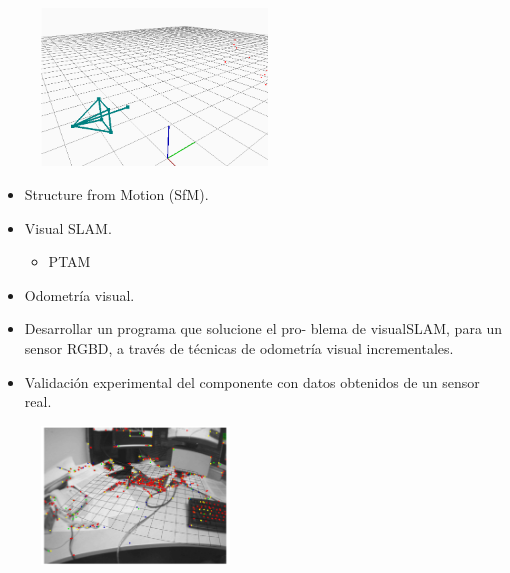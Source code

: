 \documentclass[notes,slidesec,a4]{seminar}
\begin{document}
\begin{hslide}
	\begin{minipage}{6cm}
		\begin{center}
			\begin{figure}
				\includegraphics[width=6.0cm]{img/camera-opengl.png}
			\end{figure}
		\end{center}
	\end{minipage} \hfill
	\begin{minipage}{5cm}
		\begin{itemize}
			\item Structure from Motion (SfM).
			\item Visual SLAM.
			\begin{itemize}
				\item PTAM
			\end{itemize}
			\item Odometría visual.
		\end{itemize}
	\end{minipage}
\end{hslide}


\begin{hslide}
			\begin{itemize}
			\item Desarrollar un programa que solucione el pro-
			blema de visualSLAM, para un sensor RGBD, a través de técnicas de odometría visual incrementales.
			\item Validación experimental del componente con datos obtenidos de un sensor real.
		\end{itemize}
		\begin{center}
			\begin{figure}
				\includegraphics[width=5cm] {img/ptam.png}
			\end{figure}
		\end{center}
\end{hslide}
\end{document}
